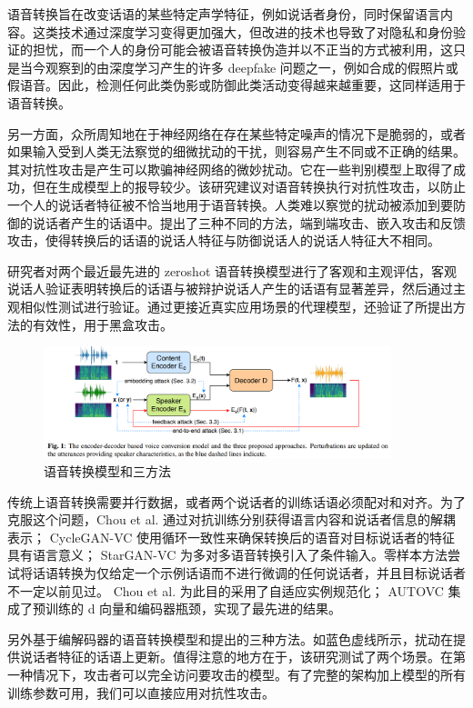 语音转换旨在改变话语的某些特定声学特征，例如说话者身份，同时保留语言内容。这类技术通过深度学习变得更加强大，但改进的技术也导致了对隐私和身份验证的担忧，而一个人的身份可能会被语音转换伪造并以不正当的方式被利用，这只是当今观察到的由深度学习产生的许多 deepfake 问题之一，例如合成的假照片或假语音。因此，检测任何此类伪影或防御此类活动变得越来越重要，这同样适用于语音转换。
 
另一方面，众所周知地在于神经网络在存在某些特定噪声的情况下是脆弱的，或者如果输入受到人类无法察觉的细微扰动的干扰，则容易产生不同或不正确的结果。其对抗性攻击是产生可以欺骗神经网络的微妙扰动。它在一些判别模型上取得了成功，但在生成模型上的报导较少。该研究建议对语音转换执行对抗性攻击，以防止一个人的说话者特征被不恰当地用于语音转换。人类难以察觉的扰动被添加到要防御的说话者产生的话语中。提出了三种不同的方法，端到端攻击、嵌入攻击和反馈攻击，使得转换后的话语的说话人特征与防御说话人的说话人特征大不相同。

研究者对两个最近最先进的 zeroshot 语音转换模型进行了客观和主观评估，客观说话人验证表明转换后的话语与被辩护说话人产生的话语有显著差异，然后通过主观相似性测试进行验证。通过更接近真实应用场景的代理模型，还验证了所提出方法的有效性，用于黑盒攻击。

\begin{figure}[htb]
\centering 
\includegraphics[width=0.90\textwidth]{img/p2m1.png} 
\caption{语音转换模型和三方法}
\label{Test}
\end{figure}

传统上语音转换需要并行数据，或者两个说话者的训练话语必须配对和对齐。为了克服这个问题，Chou et al. 通过对抗训练分别获得语言内容和说话者信息的解耦表示； CycleGAN-VC 使用循环一致性来确保转换后的语音对目标说话者的特征具有语言意义； StarGAN-VC 为多对多语音转换引入了条件输入。零样本方法尝试将话语转换为仅给定一个示例话语而不进行微调的任何说话者，并且目标说话者不一定以前见过。 Chou et al. 为此目的采用了自适应实例规范化； AUTOVC 集成了预训练的 d 向量和编码器瓶颈，实现了最先进的结果。

另外基于编解码器的语音转换模型和提出的三种方法。如蓝色虚线所示，扰动在提供说话者特征的话语上更新。值得注意的地方在于，该研究测试了两个场景。在第一种情况下，攻击者可以完全访问要攻击的模型。有了完整的架构加上模型的所有训练参数可用，我们可以直接应用对抗性攻击。


